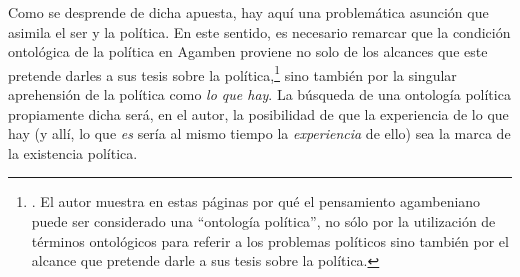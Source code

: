 Como se desprende de dicha apuesta, hay aquí una problemática asunción que asimila el ser y la política. En este sentido, es necesario remarcar que la condición ontológica de la política en Agamben proviene no solo de los alcances que este pretende darles a sus tesis sobre la política,\footnote{\cite[96-98]{@7088-GALINDOHERVAS2003}. El autor muestra en estas páginas por qué el pensamiento agambeniano puede ser considerado una \enquote{ontología política}, no sólo por la utilización de términos ontológicos para referir a los problemas políticos sino también por el alcance que pretende darle a sus tesis sobre la política.} sino también por la singular aprehensión de la política como \emph{lo que hay}. La búsqueda de una ontología política propiamente dicha será, en el autor, la posibilidad de que la experiencia de lo que hay (y allí, lo que \emph{es} sería al mismo tiempo la \emph{experiencia} de ello) sea la marca de la existencia política.


